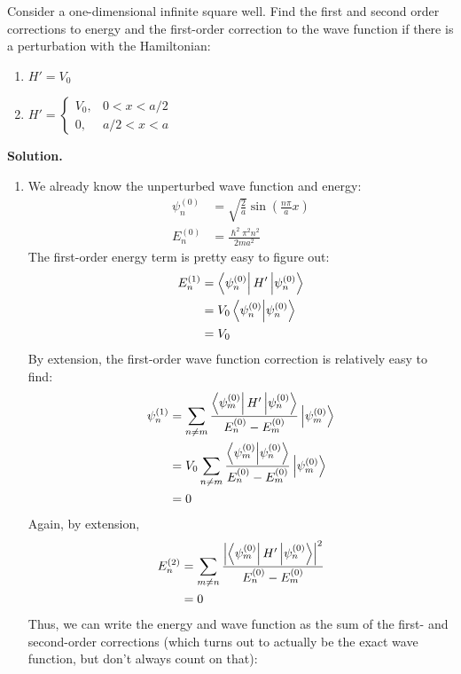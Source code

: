 \documentclass[a4paper]{article}
\begin{document}
\begin{eg}
	Consider a one-dimensional infinite square well. Find the first and
	second order corrections to energy and the first-order correction to
	the wave function if there is a perturbation with the Hamiltonian:
	\begin{enumerate}
		\item $H' = V_0$
		\item $H' = \begin{cases}V_0,&0<x<a/2\\0,&a/2<x<a\end{cases}$
	\end{enumerate}
	\textbf{Solution.}
	\begin{enumerate}
	\item
		We already know the unperturbed wave function and
		energy:
		\begin{align*}
			\psi_n^{(0)} &= \sqrt{\frac{2}{a}}
				\sin\left(\frac{n\pi}{a} x\right)\\
			E_n^{(0)} &= \frac{\hslash^2 \pi^2 n^2}{2 m a^2}
		\end{align*}
		The first-order energy term is pretty easy to figure out:
		\begin{align*}
			E_n^{(1)}&=\left\langle \psi_n^{(0)} \right\rvert H' \left\lvert \psi_n^{(0)}\right\rangle\\
				 &=V_0 \left\langle \psi_n^{(0)}\middle\vert \psi_n^{(0)} \right\rangle\\
				 &= V_0
		\end{align*}
		By extension, the first-order wave function correction is
		relatively easy to find:
		\begin{align*}
			\psi_n^{(1)} &= \sum_{n\neq m} \frac{
				\left\langle \psi_m^{(0)} \right\rvert H' \left\lvert \psi_n^{(0)}\right\rangle}{
				E_n^{(0)}-E_m^{(0)}}\left\lvert \psi_m^{(0)}\right\rangle\\
			&= V_0\sum_{n\neq m} \frac{
				\left\langle \psi_m^{(0)}\middle\vert \psi_n^{(0)} \right\rangle}{
				E_n^{(0)}-E_m^{(0)}}\left\lvert \psi_m^{(0)}\right\rangle\\
			&= 0
		\end{align*}
		Again, by extension,
		\begin{align*}
			E_n^{(2)} &= \sum_{m\neq n}\frac{
			\left\lvert \left\langle \psi_m^{(0)} \right\rvert H' \left\lvert \psi_n^{(0)}\right\rangle\right\rvert^2}
			{E_n^{(0)}-E_m^{(0)}}\\
			&= 0
		\end{align*}
		Thus, we can write the energy and wave function as the sum of
		the first- and second-order corrections (which turns out to
		actually be the exact wave function, but don't always count
		on that):
		\begin{align*}

\end{align*}
\end{enumerate}
\end{eg}
\end{document}
